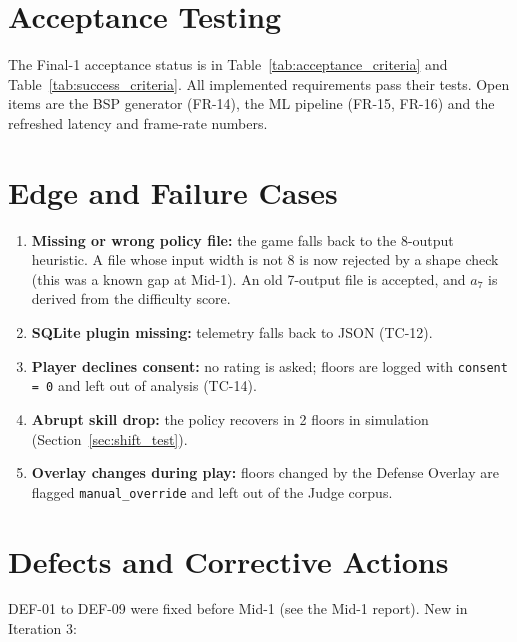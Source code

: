 \section{Acceptance Testing}
The Final-1 acceptance status is in Table~\ref{tab:acceptance_criteria} and Table~\ref{tab:success_criteria}. All implemented requirements pass their tests. Open items are the BSP generator (FR-14), the ML pipeline (FR-15, FR-16) and the refreshed latency and frame-rate numbers.

\section{Edge and Failure Cases}
\begin{enumerate}
    \item \textbf{Missing or wrong policy file:} the game falls back to the 8-output heuristic. A file whose input width is not 8 is now rejected by a shape check (this was a known gap at Mid-1). An old 7-output file is accepted, and $a_7$ is derived from the difficulty score.
    \item \textbf{SQLite plugin missing:} telemetry falls back to JSON (TC-12).
    \item \textbf{Player declines consent:} no rating is asked; floors are logged with \texttt{consent = 0} and left out of analysis (TC-14).
    \item \textbf{Abrupt skill drop:} the policy recovers in 2 floors in simulation (Section~\ref{sec:shift_test}).
    \item \textbf{Overlay changes during play:} floors changed by the Defense Overlay are flagged \texttt{manual\_override} and left out of the Judge corpus.
\end{enumerate}

\section{Defects and Corrective Actions}
\label{sec:defects}
DEF-01 to DEF-09 were fixed before Mid-1 (see the Mid-1 report). New in Iteration 3:

